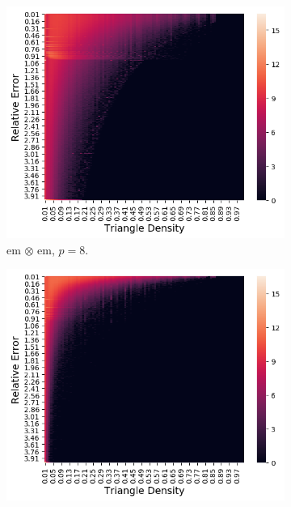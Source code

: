 \documentclass[10]{report}
\begin{document}
\begin{figure}
	\begin{center}
		\begin{subfigure}{0.32\linewidth}
			\centerline{\includegraphics[width=1.0\columnwidth]{em_x_em_edge_dist_p8}}
			\caption{em $\otimes$ em, $p=8$. \label{fig:em_x_em_edge_density_vs_rel_err_p8}}
		\end{subfigure}
		\begin{subfigure}{0.32\linewidth}
			\centerline{\includegraphics[width=1.0\columnwidth]{em_x_em_edge_dist_p12}}

\end{subfigure}
\end{center}
\end{figure}
\end{document}
